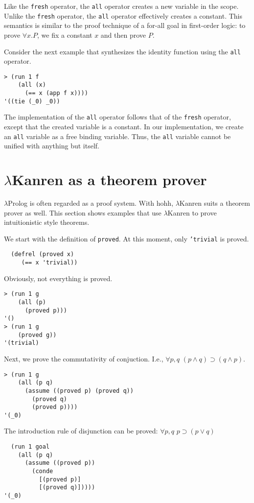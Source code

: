 \documentclass[acmlarge,review]{acmart}
\theoremstyle{definition}
\begin{document}
Like the \texttt{fresh} operator, the \texttt{all} operator creates a new
variable in the scope. Unlike the \texttt{fresh} operator, the \texttt{all}
operator effectively creates a constant. This semantics is similar to the
proof technique of a for-all goal in first-order logic: to prove
$\forall x. P$, we fix a constant $x$ and then prove $P$.

Consider the next example that synthesizes the identity function using the
\texttt{all} operator. 
\begin{lstlisting}
> (run 1 f
    (all (x)
      (== x (app f x))))
'((tie (_0) _0))
\end{lstlisting}

The implementation of the \texttt{all} operator follows that of the
\texttt{fresh} operator, except that the created variable is a constant.
In our implementation, we create an \texttt{all} variable as a free
binding variable. Thus, the \texttt{all} variable cannot be unified
with anything but itself.

\section{$\lambda$Kanren as a theorem prover}
$\lambda$Prolog is often regarded as a proof system. With hohh,
$\lambda$Kanren suits a theorem prover as well.
This section shows examples that use $\lambda$Kanren to prove
intuitionistic style theorems.

We start with the definition of \texttt{proved}. At this moment,
only \texttt{'trivial} is proved.
\begin{lstlisting}
  (defrel (proved x)
     (== x 'trivial))
\end{lstlisting}

Obviously, not everything is proved.
\begin{lstlisting}
> (run 1 g
    (all (p)
      (proved p)))
'()
> (run 1 g
    (proved g))
'(trivial)
\end{lstlisting}

Next, we prove the commutativity of conjuction. I.e.,
  $\forall p,q \,\, (p \wedge q) \supset (q \wedge p)$.
\begin{lstlisting}
> (run 1 g
    (all (p q)
      (assume ((proved p) (proved q))
        (proved q)
        (proved p))))
'(_0)
\end{lstlisting}

The introduction rule of disjunction can be proved:
$\forall p,q \,\, p \supset (p \vee q)$
\begin{lstlisting}
  (run 1 goal
    (all (p q)
      (assume ((proved p))
        (conde
          [(proved p)]
          [(proved q)]))))
'(_0)
\end{lstlisting}
\end{document}
